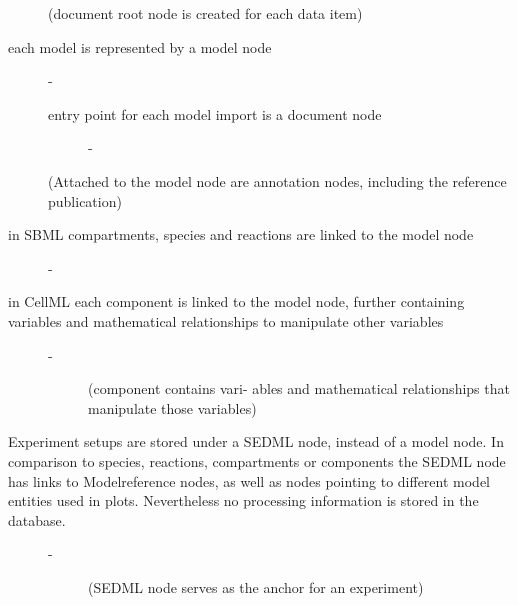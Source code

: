 \begin{description}
\begin{description}
\begin{description}
\begin{description}
\begin{description}
          \item[ \cite{Henkel2015} ] (document root node is created for each data item)
          \item[each model is represented by a model node] - 
          \begin{description}
            \item[entry point for each model import is a document node] - 
          \end{description} %
          \item[ \cite{Henkel2015} ] (Attached to the model node are annotation nodes, including the reference publication)
          \item[in SBML compartments, species and reactions are linked to the model node] - 
          \item[in CellML each component is linked to the model node, further containing variables and mathematical relationships to manipulate other variables] - 
          \begin{description}
            \item[ \cite{Henkel2015} ] (component contains vari- ables and mathematical relationships that manipulate those variables)
          \end{description} %
          \item[Experiment setups are stored under a SEDML node, instead of a model node. In comparison to species, reactions, compartments or components the SEDML node has links to Modelreference nodes, as well as nodes pointing to different model entities used in plots. Nevertheless no processing information is stored in the database.] - 
          \begin{description}
            \item[ \cite{Henkel2015} ] (SEDML node serves as the anchor for an experiment)

\end{description}
\end{description}
\end{description}
\end{description}
\end{description}
\end{description}
